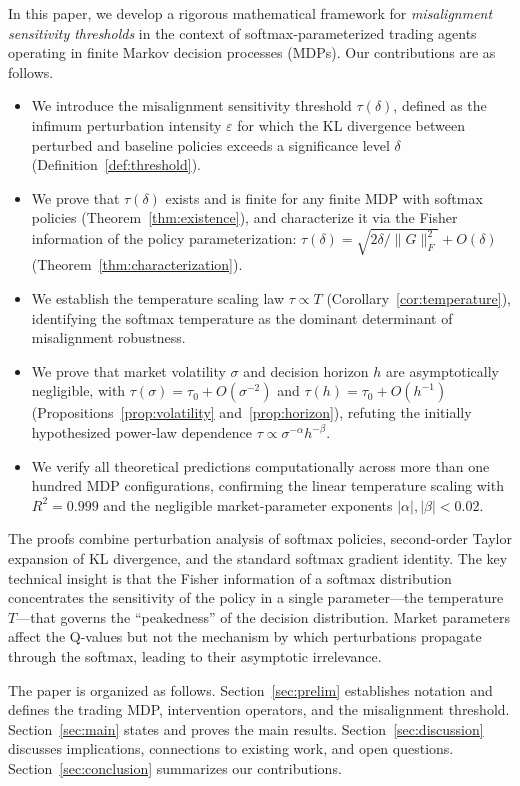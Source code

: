 In this paper, we develop a rigorous mathematical framework for
\emph{misalignment sensitivity thresholds} in the context of
softmax-parameterized trading agents operating in finite Markov decision
processes (MDPs). Our contributions are as follows.

\begin{itemize}[leftmargin=*,itemsep=2pt,topsep=4pt]
\item We introduce the misalignment sensitivity threshold $\tau(\delta)$,
  defined as the infimum perturbation intensity $\varepsilon$ for which the
  KL divergence between perturbed and baseline policies exceeds a
  significance level $\delta$ (Definition~\ref{def:threshold}).
\item We prove that $\tau(\delta)$ exists and is finite for any finite MDP
  with softmax policies (Theorem~\ref{thm:existence}), and characterize it
  via the Fisher information of the policy parameterization:
  $\tau(\delta) = \sqrt{2\delta/\lVert G \rVert_F^2} + O(\delta)$
  (Theorem~\ref{thm:characterization}).
\item We establish the temperature scaling law $\tau \propto T$
  (Corollary~\ref{cor:temperature}), identifying the softmax temperature as
  the dominant determinant of misalignment robustness.
\item We prove that market volatility $\sigma$ and decision horizon $h$ are
  asymptotically negligible, with $\tau(\sigma) = \tau_0 + O(\sigma^{-2})$
  and $\tau(h) = \tau_0 + O(h^{-1})$ (Propositions~\ref{prop:volatility}
  and~\ref{prop:horizon}), refuting the initially hypothesized power-law
  dependence $\tau \propto \sigma^{-\alpha} h^{-\beta}$.
\item We verify all theoretical predictions computationally across more than
  one hundred MDP configurations, confirming the linear temperature scaling
  with $R^2 = 0.999$ and the negligible market-parameter exponents
  $|\alpha|, |\beta| < 0.02$.
\end{itemize}

The proofs combine perturbation analysis of softmax policies, second-order
Taylor expansion of KL divergence, and the standard softmax gradient identity.
The key technical insight is that the Fisher information of a softmax
distribution concentrates the sensitivity of the policy in a single
parameter---the temperature $T$---that governs the ``peakedness'' of the
decision distribution. Market parameters affect the Q-values but not the
mechanism by which perturbations propagate through the softmax, leading to
their asymptotic irrelevance.

The paper is organized as follows. Section~\ref{sec:prelim} establishes
notation and defines the trading MDP, intervention operators, and the
misalignment threshold. Section~\ref{sec:main} states and proves the main
results. Section~\ref{sec:discussion} discusses implications, connections to
existing work, and open questions. Section~\ref{sec:conclusion} summarizes
our contributions.
